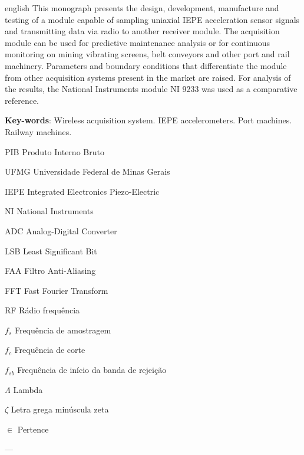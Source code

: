 \documentclass[
	12pt,				%
	openright,			%
	twoside,			%
	a4paper,			%
	english,			%
	french,				%
	spanish,			%
	brazil,				%
	]{abntex2}
\begin{document}
\begin{resumo}[Abstract]
	\begin{otherlanguage*}{english}
		This monograph presents the design, development, manufacture and testing of a module capable of sampling uniaxial IEPE acceleration sensor signals and transmitting data via radio to another receiver module. The acquisition module can be used for predictive maintenance analysis or for continuous monitoring on mining vibrating screens, belt conveyors and other port and rail machinery. Parameters and boundary conditions that differentiate the module from other acquisition systems present in the market are raised. For analysis of the results, the National Instruments module NI 9233 was used as a comparative reference.

		\vspace{\onelineskip}
		
		\noindent 
		\textbf{Key-words}: Wireless acquisition system. IEPE accelerometers. Port machines. Railway machines.
	\end{otherlanguage*}
\end{resumo}

\listoffigures*
\cleardoublepage

\listoftables*
\cleardoublepage

\begin{siglas}
	\item[PIB] Produto Interno Bruto
	\item[UFMG] Universidade Federal de Minas Gerais
	\item[IEPE] Integrated Electronics Piezo-Electric
	\item[NI] National Instruments
	\item[ADC] Analog-Digital Converter
	\item[LSB] Least Significant Bit
	\item[FAA] Filtro Anti-Aliasing
	\item[FFT] Fast Fourier Transform
	\item[RF] Rádio frequência
\end{siglas}

\begin{simbolos}
  \item[$ f_{s} $] Frequência de amostragem
  \item[$ f_{c} $] Frequência de corte
  \item[$ f_{sb} $] Frequência de início da banda de rejeição
  \item[$ \Lambda $] Lambda
  \item[$ \zeta $] Letra grega minúscula zeta
  \item[$ \in $] Pertence
\end{simbolos}
---
\end{document}
